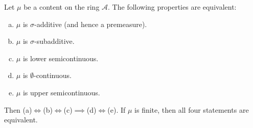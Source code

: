 \begin{theorem}
\label{tripledoubleEquivalence}
    Let $\mu$ be a content on the ring $\mathcal{A}$. The following properties are equivalent:
    \begin{enumerate}[(a)]
        \item $\mu$ is $\sigma$-additive (and hence a premeasure).
        \item $\mu$ is $\sigma$-subadditive.
        \item $\mu$ is lower semicontinuous.
        \item $\mu$ is $\emptyset$-continuous.
        \item $\mu$ is upper semicontinuous.
    \end{enumerate}
    Then (a)$\iff$(b)$\iff$(c)$\implies$(d)$\iff$(e).
    If $\mu$ is finite, then all four statements are equivalent.
\end{theorem}

